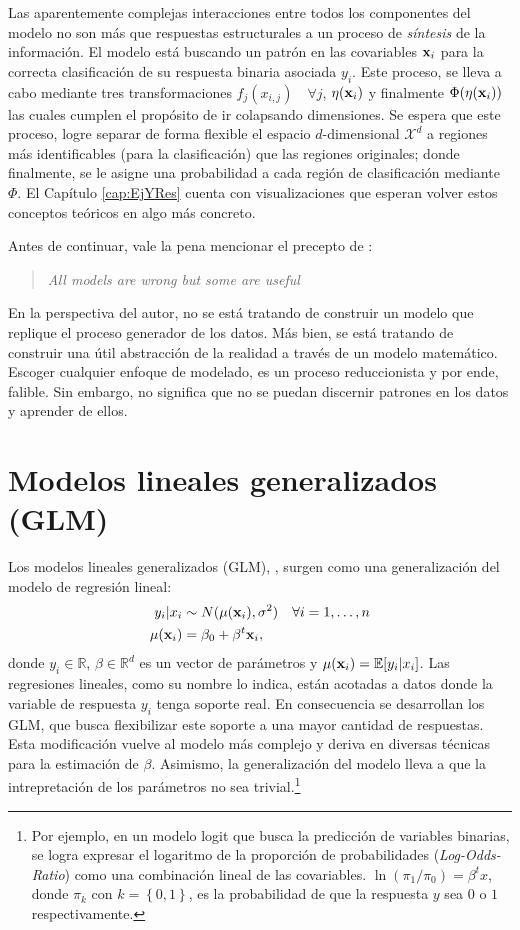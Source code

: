 \documentclass[../Main/Main.tex]{subfiles}
\begin{document}
Las aparentemente complejas interacciones entre todos los componentes del modelo no son más que respuestas estructurales a un proceso de \textit{síntesis} de la información. El modelo está buscando un patrón en las covariables $\mathbf{x}_i$ para la correcta clasificación de su respuesta binaria asociada $y_i$. Este proceso, se lleva a cabo mediante tres transformaciones $f_j(x_{i,j}) \quad \forall j$, $\eta(\mathbf{x}_i)$ y finalmente $\Phi(\eta(\mathbf{x}_i))$ las cuales cumplen el propósito de ir colapsando dimensiones. Se espera que este proceso, logre separar de forma flexible el espacio $d$-dimensional $\mathcal{X}^d$ a regiones más identificables (para la clasificación) que las regiones originales; donde finalmente, se le asigne una probabilidad a cada región de clasificación mediante $\Phi$. El Capítulo \ref{cap:EjYRes} cuenta con visualizaciones que esperan volver estos conceptos teóricos en algo más concreto. 

Antes de continuar, vale la pena mencionar el precepto de \citet{box1979robustnessinthe}:
\begin{quote}
\textit{All models are wrong but some are useful}
\end{quote}
En la perspectiva del autor, no se está tratando de construir un modelo que replique el proceso generador de los datos. Más bien, se está tratando de construir una útil abstracción de la realidad a través de un modelo matemático. Escoger cualquier enfoque de modelado, es un proceso reduccionista y por ende, falible. Sin embargo, no significa que no se puedan discernir patrones en los datos y aprender de ellos. 

\section{Modelos lineales generalizados (GLM)} \label{sec:GLM}
Los modelos lineales generalizados (GLM), \citet{maccullagh1989generalized}, surgen como una generalización del modelo de regresión lineal:
\begin{align*}
	y_i|x_i &\sim N(\mu(\mathbf{x}_i), \sigma^2)  \quad \forall i = 1,\ldots,n\\
	\mu(\mathbf{x}_i) &= \beta_0 + \beta^t\mathbf{x}_i,
\end{align*}
donde $y_i \in\mathbb{R}$, $\beta \in \mathbb{R}^{d}$ es un vector de parámetros y $\mu(\mathbf{x}_i) = \mathbb{E}[y_i|x_i]$. Las regresiones lineales, como su nombre lo indica, están acotadas a datos donde la variable de respuesta $y_i$ tenga soporte real. En consecuencia se desarrollan los GLM, que busca flexibilizar este soporte a una mayor cantidad de respuestas. Esta modificación vuelve al modelo más complejo y deriva en diversas técnicas para la estimación de $\beta$. Asimismo, la generalización del modelo lleva a que la intrepretación de los parámetros no sea trivial.\footnote{Por ejemplo, en un modelo logit que busca la predicción de variables binarias, se logra expresar el logaritmo de la proporción de probabilidades (\textit{Log-Odds-Ratio}) como una combinación lineal de las covariables. $\ln(\pi_1 / \pi_0) = \beta^t x$, donde $\pi_k$ con  $k = \left\{0,1\right\}$, es la probabilidad de que la respuesta $y$ sea $0$ o $1$ respectivamente.}\\
\end{document}
